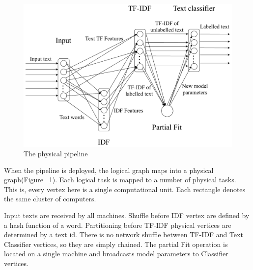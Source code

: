 \begin{figure}[htbp]
  \centering
  \includegraphics[scale=0.375]{pics/physical-graph}
  \caption{The physical pipeline}
  \label {physical_graph}
\end{figure}

When the pipeline is deployed, the logical graph maps into a physical graph(Figure ~\ref{physical_graph}). Each logical task is mapped to a number of physical tasks. This is, every vertex here is a single computational unit. Each rectangle denotes the same cluster of computers.

Input texts are received by all machines. Shuffle before IDF vertex are defined by a hash function of a word. Partitioning before TF-IDF physical vertices are determined by a text id. There is no network shuffle between TF-IDF and Text Classifier vertices, so they are simply chained. The partial Fit operation is located on a single machine and broadcasts model parameters to Classifier vertices.


